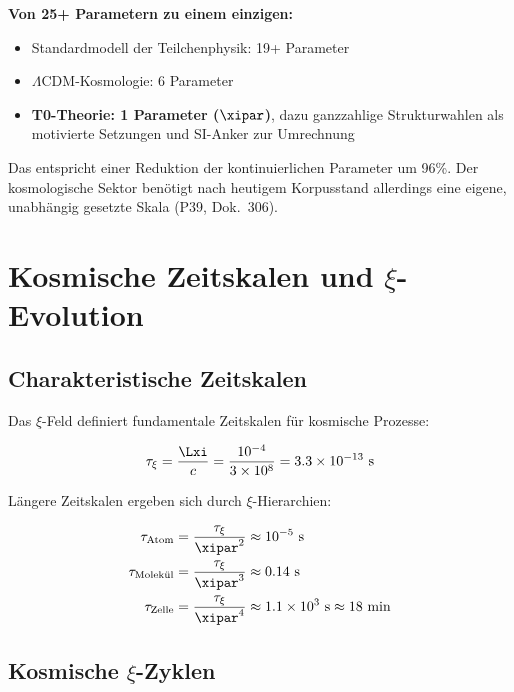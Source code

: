 	\begin{revolutionary}[Kernaussage]
		\textbf{Von 25+ Parametern zu einem einzigen:}
		
		\begin{itemize}
			\item Standardmodell der Teilchenphysik: 19+ Parameter
			\item $\Lambda$CDM-Kosmologie: 6 Parameter
			\item \textbf{T0-Theorie: 1 Parameter ($\xipar$)}, dazu ganzzahlige Strukturwahlen als motivierte Setzungen und SI-Anker zur Umrechnung
		\end{itemize}
		
		Das entspricht einer Reduktion der kontinuierlichen Parameter um 96\%. Der kosmologische Sektor benötigt nach heutigem Korpusstand allerdings eine eigene, unabhängig gesetzte Skala (P39, Dok.~306).
	\end{revolutionary}
	
	\section{Kosmische Zeitskalen und $\xi$-Evolution}
	
	\subsection{Charakteristische Zeitskalen}
	
	Das $\xi$-Feld definiert fundamentale Zeitskalen für kosmische Prozesse:
	
	\begin{equation}
		\tau_\xi = \frac{\Lxi}{c} = \frac{10^{-4}}{3 \times 10^8} = 3.3 \times 10^{-13} \text{ s}
	\end{equation}
	
	Längere Zeitskalen ergeben sich durch $\xi$-Hierarchien:
	
	\begin{align}
		\tau_{\text{Atom}} &= \frac{\tau_\xi}{\xipar^2} \approx 10^{-5} \text{ s} \\
		\tau_{\text{Molekül}} &= \frac{\tau_\xi}{\xipar^3} \approx 0.14 \text{ s} \\
		\tau_{\text{Zelle}} &= \frac{\tau_\xi}{\xipar^4} \approx 1.1 \times 10^3 \text{ s} \approx 18 \text{ min}
	\end{align}
	
	\subsection{Kosmische $\xi$-Zyklen}
	
